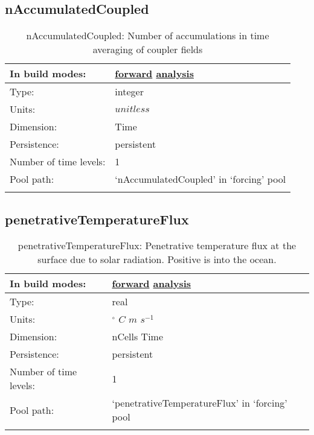 \subsection[nAccumulatedCoupled]{nAccumulatedCoupled}
\label{subsec:var_sec_forcing_nAccumulatedCoupled}
\begin{center}
\begin{longtable}{| p{2.0in} | p{4.0in} |}
        \hline 
        In build modes: & \hyperref[subsec:forward_var_tab_forcing]{forward} \hyperref[subsec:analysis_var_tab_forcing]{analysis} \\
        \hline 
        Type: & integer \\
        \hline 
        Units: & $unitless$ \\
        \hline 
        Dimension: & Time \\
        \hline 
        Persistence: & persistent \\
        \hline 
        Number of time levels: & 1 \\
        \hline 
            Pool path: & `nAccumulatedCoupled' in `forcing' pool \\
		 \hline 
    \caption{nAccumulatedCoupled: Number of accumulations in time averaging of coupler fields}
\end{longtable}
\end{center}
\subsection[penetrativeTemperatureFlux]{penetrativeTemperatureFlux}
\label{subsec:var_sec_forcing_penetrativeTemperatureFlux}
\begin{center}
\begin{longtable}{| p{2.0in} | p{4.0in} |}
        \hline 
        In build modes: & \hyperref[subsec:forward_var_tab_forcing]{forward} \hyperref[subsec:analysis_var_tab_forcing]{analysis} \\
        \hline 
        Type: & real \\
        \hline 
        Units: & $^\circ$ $C$ $m$ $s^{-1}$ \\
        \hline 
        Dimension: & nCells Time \\
        \hline 
        Persistence: & persistent \\
        \hline 
        Number of time levels: & 1 \\
        \hline 
            Pool path: & `penetrativeTemperatureFlux' in `forcing' pool \\
		 \hline 
    \caption{penetrativeTemperatureFlux: Penetrative temperature flux at the surface due to solar radiation. Positive is into the ocean.}
\end{longtable}
\end{center}
